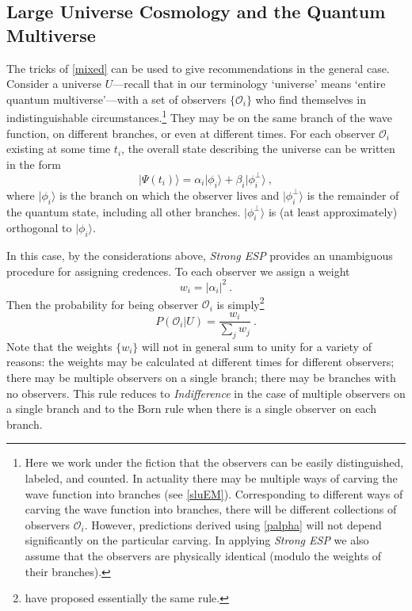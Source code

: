 \documentclass[12pt,onecolumn,secnumarabic,amsmath,amssymb,balancelastpage,nofootinbib]{article}
\newcommand{\calo}{{\mathcal O}}
\begin{document}
\subsection{Large Universe Cosmology and the Quantum Multiverse}\label{generalmethod}

The tricks of \textsection \ref{mixed} can be used to give recommendations in the general case.  Consider a universe $U$---recall that in our terminology `universe' means `entire quantum multiverse'---with a set of observers $\{\calo_i\}$ who find themselves in indistinguishable circumstances.\footnote{Here we work under the fiction that the observers can be easily distinguished, labeled, and counted.  In actuality there may be multiple ways of carving the wave function into branches {(see \textsection \ref{sluEM})}.  Corresponding to different ways of carving the wave function into branches, there will be different collections of observers $\calo_i$.  However, predictions derived using \eqref{palpha} will not depend significantly on the particular carving.  In applying \emph{Strong ESP} we also assume that the observers are physically identical (modulo the weights of their branches).} They may be on the same branch of the wave function, on different branches, or even at different times. For each observer $\calo_i$ existing at some time $t_i$, the overall state describing the universe can be written in the form
\begin{equation}
  |\Psi(t_i)\rangle = \alpha_{i} |\phi_i\rangle + \beta_i|\phi^\perp_i\rangle\ ,
\end{equation}
where $|\phi_i\rangle$ is the branch on which the observer lives and $|\phi^\perp_i\rangle$ is the remainder of the quantum state, including all other branches.  $|\phi^\perp_i\rangle$ is (at least approximately) orthogonal to $|\phi_i\rangle$.

In this case, by the considerations above, \emph{Strong ESP} provides an unambiguous procedure for assigning credences. To each observer we assign a weight
\begin{equation}
  w_i = |\alpha_i|^2\ .
\end{equation}
Then the probability for being observer $\calo_i$ is simply\footnote{\citet{groisman2013} have proposed essentially the same rule.}
\begin{equation}
  P(\calo_i|U) = \frac{w_i}{\sum_j w_j}\ .
  \label{palpha}
\end{equation}
Note that the weights $\{w_i\}$ will not in general sum to unity for a variety of reasons: the weights may be calculated at different times for different observers; there may be multiple observers on a single branch; there may be branches with no observers. This rule reduces to {\it Indifference} in the case of multiple observers on a single branch and to the Born rule when there is a single observer on each branch.
\end{document}
